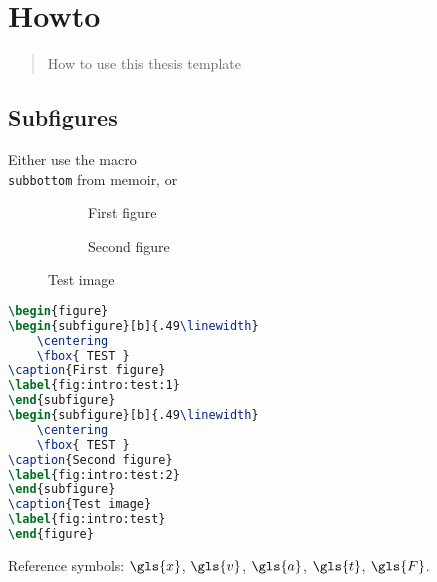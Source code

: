 \chapter{Howto}
\label{c:howto}

\begin{abstract}%
    How to use this thesis template
\end{abstract}

\section{Subfigures}
\label{s:howto:subfigures}
Either use the macro \texttt{\\subbottom} from memoir, or 

\begin{figure}
\begin{subfigure}[b]{.49\linewidth} 
    \centering
\caption{First figure}
\label{fig:intro:test:1}
\end{subfigure}
\begin{subfigure}[b]{.49\linewidth} 
    \centering
\caption{Second figure}
\label{fig:intro:test:2}
\end{subfigure}
\caption{Test image}
\label{fig:intro:test}
\end{figure}

\begin{lstlisting}[language=tex]
\begin{figure}
\begin{subfigure}[b]{.49\linewidth} 
    \centering
    \fbox{ TEST }
\caption{First figure}
\label{fig:intro:test:1}
\end{subfigure}
\begin{subfigure}[b]{.49\linewidth} 
    \centering
    \fbox{ TEST }
\caption{Second figure}
\label{fig:intro:test:2}
\end{subfigure}
\caption{Test image}
\label{fig:intro:test}
\end{figure}
\end{lstlisting}

Reference symbols: $\gls{x}$, $\gls{v}$, $\gls{a}$, $\gls{t}$, $\gls{F}$.
